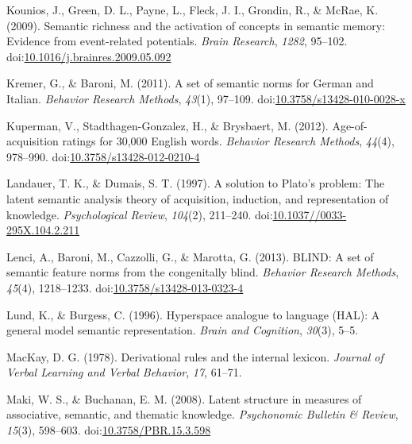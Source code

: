 \documentclass[english,,man]{apa6}
\theoremstyle{definition}
\theoremstyle{definition}
\theoremstyle{definition}
\theoremstyle{remark}
\begin{document}
\leavevmode\hypertarget{ref-Kounios2009}{}%
Kounios, J., Green, D. L., Payne, L., Fleck, J. I., Grondin, R., \&
McRae, K. (2009). Semantic richness and the activation of concepts in
semantic memory: Evidence from event-related potentials. \emph{Brain
Research}, \emph{1282}, 95--102.
doi:\href{https://doi.org/10.1016/j.brainres.2009.05.092}{10.1016/j.brainres.2009.05.092}

\leavevmode\hypertarget{ref-Kremer2011a}{}%
Kremer, G., \& Baroni, M. (2011). A set of semantic norms for German and
Italian. \emph{Behavior Research Methods}, \emph{43}(1), 97--109.
doi:\href{https://doi.org/10.3758/s13428-010-0028-x}{10.3758/s13428-010-0028-x}

\leavevmode\hypertarget{ref-Kuperman2012}{}%
Kuperman, V., Stadthagen-Gonzalez, H., \& Brysbaert, M. (2012).
Age-of-acquisition ratings for 30,000 English words. \emph{Behavior
Research Methods}, \emph{44}(4), 978--990.
doi:\href{https://doi.org/10.3758/s13428-012-0210-4}{10.3758/s13428-012-0210-4}

\leavevmode\hypertarget{ref-Landauer1997}{}%
Landauer, T. K., \& Dumais, S. T. (1997). A solution to Plato's problem:
The latent semantic analysis theory of acquisition, induction, and
representation of knowledge. \emph{Psychological Review}, \emph{104}(2),
211--240.
doi:\href{https://doi.org/10.1037//0033-295X.104.2.211}{10.1037//0033-295X.104.2.211}

\leavevmode\hypertarget{ref-Lenci2013}{}%
Lenci, A., Baroni, M., Cazzolli, G., \& Marotta, G. (2013). BLIND: A set
of semantic feature norms from the congenitally blind. \emph{Behavior
Research Methods}, \emph{45}(4), 1218--1233.
doi:\href{https://doi.org/10.3758/s13428-013-0323-4}{10.3758/s13428-013-0323-4}

\leavevmode\hypertarget{ref-Lund1996}{}%
Lund, K., \& Burgess, C. (1996). Hyperspace analogue to language (HAL):
A general model semantic representation. \emph{Brain and Cognition},
\emph{30}(3), 5--5.

\leavevmode\hypertarget{ref-MacKay1978}{}%
MacKay, D. G. (1978). Derivational rules and the internal lexicon.
\emph{Journal of Verbal Learning and Verbal Behavior}, \emph{17},
61--71.

\leavevmode\hypertarget{ref-Maki2008}{}%
Maki, W. S., \& Buchanan, E. M. (2008). Latent structure in measures of
associative, semantic, and thematic knowledge. \emph{Psychonomic
Bulletin \& Review}, \emph{15}(3), 598--603.
doi:\href{https://doi.org/10.3758/PBR.15.3.598}{10.3758/PBR.15.3.598}
\end{document}
